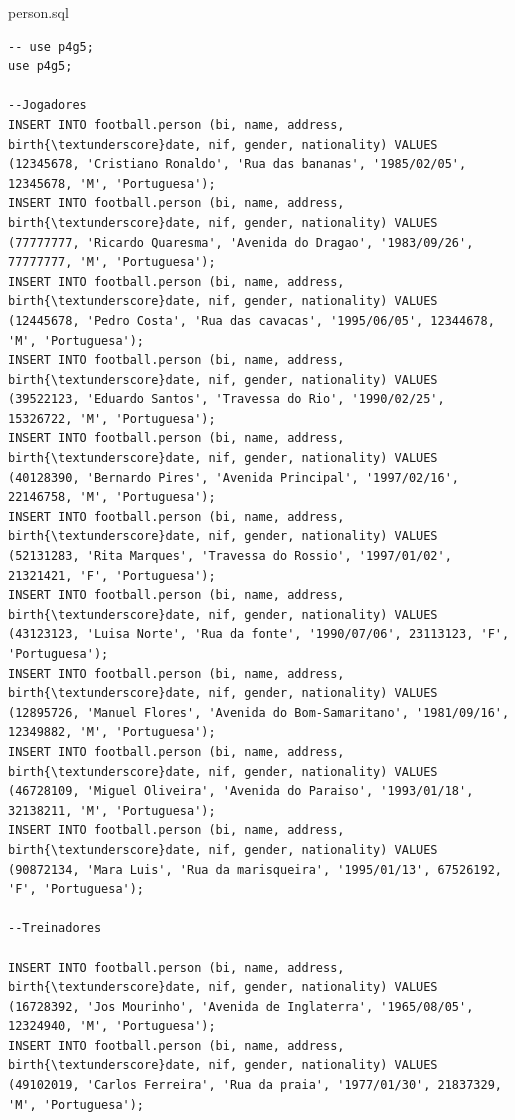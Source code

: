 \documentclass[pdftex,12pt,a4paper]{report}
\begin{document}
person.sql
\begin{lstlisting} 
-- use p4g5;
use p4g5;

--Jogadores
INSERT INTO football.person (bi, name, address, birth{\textunderscore}date, nif, gender, nationality) VALUES (12345678, 'Cristiano Ronaldo', 'Rua das bananas', '1985/02/05', 12345678, 'M', 'Portuguesa');
INSERT INTO football.person (bi, name, address, birth{\textunderscore}date, nif, gender, nationality) VALUES (77777777, 'Ricardo Quaresma', 'Avenida do Dragao', '1983/09/26', 77777777, 'M', 'Portuguesa'); 
INSERT INTO football.person (bi, name, address, birth{\textunderscore}date, nif, gender, nationality) VALUES (12445678, 'Pedro Costa', 'Rua das cavacas', '1995/06/05', 12344678, 'M', 'Portuguesa'); 
INSERT INTO football.person (bi, name, address, birth{\textunderscore}date, nif, gender, nationality) VALUES (39522123, 'Eduardo Santos', 'Travessa do Rio', '1990/02/25', 15326722, 'M', 'Portuguesa'); 
INSERT INTO football.person (bi, name, address, birth{\textunderscore}date, nif, gender, nationality) VALUES (40128390, 'Bernardo Pires', 'Avenida Principal', '1997/02/16', 22146758, 'M', 'Portuguesa'); 
INSERT INTO football.person (bi, name, address, birth{\textunderscore}date, nif, gender, nationality) VALUES (52131283, 'Rita Marques', 'Travessa do Rossio', '1997/01/02', 21321421, 'F', 'Portuguesa');
INSERT INTO football.person (bi, name, address, birth{\textunderscore}date, nif, gender, nationality) VALUES (43123123, 'Luisa Norte', 'Rua da fonte', '1990/07/06', 23113123, 'F', 'Portuguesa'); 
INSERT INTO football.person (bi, name, address, birth{\textunderscore}date, nif, gender, nationality) VALUES (12895726, 'Manuel Flores', 'Avenida do Bom-Samaritano', '1981/09/16', 12349882, 'M', 'Portuguesa');
INSERT INTO football.person (bi, name, address, birth{\textunderscore}date, nif, gender, nationality) VALUES (46728109, 'Miguel Oliveira', 'Avenida do Paraiso', '1993/01/18', 32138211, 'M', 'Portuguesa');
INSERT INTO football.person (bi, name, address, birth{\textunderscore}date, nif, gender, nationality) VALUES (90872134, 'Mara Luis', 'Rua da marisqueira', '1995/01/13', 67526192, 'F', 'Portuguesa'); 

--Treinadores

INSERT INTO football.person (bi, name, address, birth{\textunderscore}date, nif, gender, nationality) VALUES (16728392, 'Jos Mourinho', 'Avenida de Inglaterra', '1965/08/05', 12324940, 'M', 'Portuguesa');
INSERT INTO football.person (bi, name, address, birth{\textunderscore}date, nif, gender, nationality) VALUES (49102019, 'Carlos Ferreira', 'Rua da praia', '1977/01/30', 21837329, 'M', 'Portuguesa'); 


\end{lstlisting}
\end{document}

